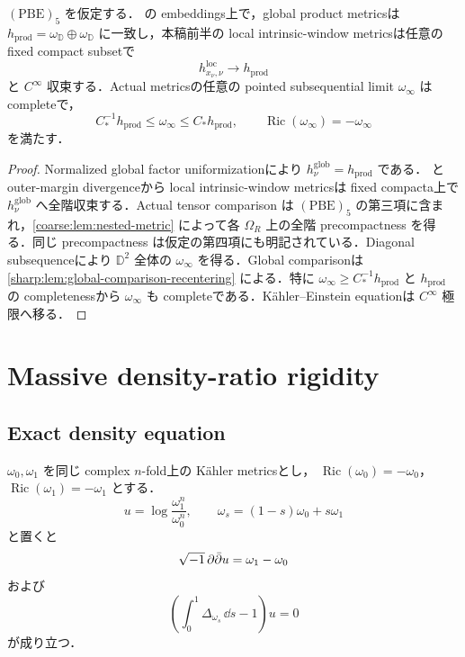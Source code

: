 \documentclass[a4paper,11pt]{ltjsarticle}
\numberwithin{equation}{section}
\theoremstyle{plain}
\theoremstyle{definition}
\theoremstyle{remark}
\newcommand{\Ric}{\operatorname{Ric}}\newcommand{\tr}{\operatorname{tr}}\newcommand{\osc}{\operatorname{osc}}\newcommand{\vol}{\operatorname{Vol}}
\begin{document}
\begin{proposition}\label{sharp:prop:envelope-limit}
$\mathrm{(PBE)}_5$ を仮定する．
 の embeddings上で，global product metricsは $h_{\mathrm{prod}}=\omega_{\mathbb D}\oplus\omega_{\mathbb D}$ に一致し，本稿前半の local intrinsic-window metricsは任意の fixed compact subsetで
\begin{equation}\label{sharp:eq:envelope-product-limit}
 h^{\mathrm{loc}}_{x_\nu,\nu}\longrightarrow h_{\mathrm{prod}}
\end{equation}
と $C^\infty$ 収束する．Actual metricsの任意の pointed subsequential limit $\omega_\infty$ は completeで，
\begin{equation}\label{sharp:eq:limit-comparison}
 C_*^{-1}h_{\mathrm{prod}}\le\omega_\infty\le C_*h_{\mathrm{prod}},
 \qquad \Ric(\omega_\infty)=-\omega_\infty
\end{equation}
を満たす．
\end{proposition}

\begin{proof}
Normalized global factor uniformizationにより $h^{\mathrm{glob}}_\nu=h_{\mathrm{prod}}$ である． と outer-margin divergenceから local intrinsic-window metricsは fixed compacta上で $h^{\mathrm{glob}}_\nu$ へ全階収束する．Actual tensor comparison は $\mathrm{(PBE)}_5$ の第三項に含まれ，\cref{coarse:lem:nested-metric} によって各 $\Omega_R$ 上の全階 precompactness を得る．同じ precompactness は仮定の第四項にも明記されている．Diagonal subsequenceにより $\mathbb D^2$ 全体の $\omega_\infty$ を得る．Global comparisonは \cref{sharp:lem:global-comparison-recentering} による．特に $\omega_\infty\ge C_*^{-1}h_{\mathrm{prod}}$ と $h_{\mathrm{prod}}$ の completenessから $\omega_\infty$ も completeである．K\"ahler--Einstein equationは $C^\infty$ 極限へ移る．
\end{proof}

\section{Massive density-ratio rigidity}\label{sharp:sec:massive}

\subsection{Exact density equation}

\begin{lemma}\label{sharp:lem:density-ratio}
$\omega_0,\omega_1$ を同じ complex $n$-fold上の Kähler metricsとし，
$\Ric(\omega_0)=-\omega_0$，$\Ric(\omega_1)=-\omega_1$ とする．
\[
 u=\log\frac{\omega_1^n}{\omega_0^n},\qquad
 \omega_s=(1-s)\omega_0+s\omega_1
\]
と置くと
\begin{equation}\label{sharp:eq:ddcu}
 \sqrt{-1}\,\partial\bar\partial u=\omega_1-\omega_0
\end{equation}
および
\begin{equation}\label{sharp:eq:massive-equation}
 \left(\int_0^1\Delta_{\omega_s}\,\dd s-1\right)u=0
\end{equation}
が成り立つ．
\end{lemma}
\end{document}
